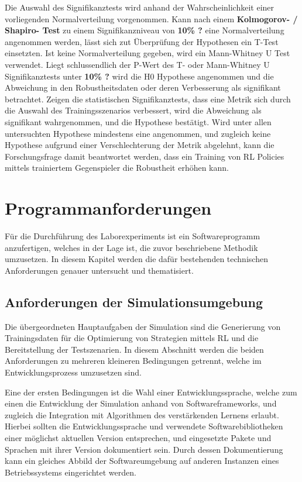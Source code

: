 Die Auswahl des Signifikanztests wird anhand der Wahrscheinlichkeit einer vorliegenden Normalverteilung vorgenommen.
Kann nach einem \textbf{Kolmogorov- / Shapiro- Test} zu einem Signifikanzniveau von \textbf{10\% ?} eine Normalverteilung angenommen werden, lässt sich zut Überprüfung der Hypothesen ein T-Test einsetzten.
Ist keine Normalverteilung gegeben, wird ein Mann-Whitney U Test verwendet.
Liegt schlussendlich der P-Wert des T- oder Mann-Whitney U Signifikanztests unter \textbf{10\% ?} wird die H0 Hypothese angenommen und die Abweichung in den Robustheitsdaten oder deren Verbesserung als signifikant betrachtet.
Zeigen die statistischen Signifikanztests, dass eine Metrik sich durch die Auswahl des Trainingsszenarios verbessert, wird die Abweichung als signifikant wahrgenommen, und die Hypothese bestätigt.
Wird unter allen untersuchten Hypothese mindestens eine angenommen, und zugleich keine Hypothese aufgrund einer Verschlechterung der Metrik abgelehnt, kann die Forschungsfrage damit beantwortet werden, dass ein Training von RL Policies mittels trainiertem Gegenspieler die Robustheit erhöhen kann.

\section{Programmanforderungen}

Für die Durchführung des Laborexperiments ist ein Softwareprogramm anzufertigen, welches in der Lage ist, die zuvor beschriebene Methodik umzusetzen.
In diesem Kapitel werden die dafür bestehenden technischen Anforderungen genauer untersucht und thematisiert. 

\subsection{Anforderungen der Simulationsumgebung}

Die übergeordneten Hauptaufgaben der Simulation sind die Generierung von Trainingsdaten für die Optimierung von Strategien mittels RL und die Bereitstellung der Testszenarien.
In diesem Abschnitt werden die beiden Anforderungen zu mehreren kleineren Bedingungen getrennt, welche im Entwicklungsprozess umzusetzen sind.

Eine der ersten Bedingungen ist die Wahl einer Entwicklungssprache, welche zum einen die Entwicklung der Simulation anhand von Softwareframeworks, und zugleich die Integration mit Algorithmen des verstärkenden Lernens erlaubt.
Hierbei sollten die Entwicklungssprache und verwendete Softwarebibliotheken einer möglichst aktuellen Version entsprechen, und eingesetzte Pakete und Sprachen mit ihrer Version dokumentiert sein.
Durch dessen Dokumentierung kann ein gleiches Abbild der Softwareumgebung auf anderen Instanzen eines Betriebssystems eingerichtet werden. 

